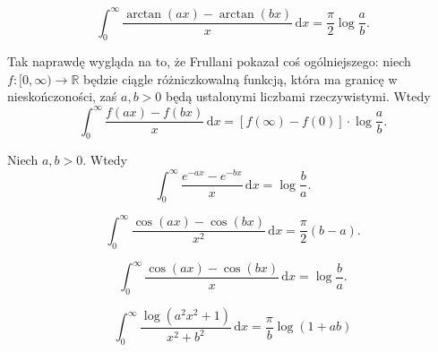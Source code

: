 \begin{problem}
    \begin{equation}
        \int_0^\infty \frac{\arctan (ax) - \arctan (bx)}{x} \,\mathrm{d}x = \frac \pi 2 \log \frac a b.
    \end{equation}
\end{problem}

Tak naprawdę wygląda na to, że Frullani pokazał coś ogólniejszego: niech $f \colon [0, \infty) \to \mathbb R$ będzie ciągle różniczkowalną funkcją, która ma granicę w nieskończoności, zaś $a, b > 0$ będą ustalonymi liczbami rzeczywistymi.
%
Wtedy
\begin{equation}
    \int_0^\infty \frac{f(ax) - f(bx)}{x} \,\mathrm{d} x = [f(\infty) - f(0)] \cdot \log \frac a b.
\end{equation}

\begin{problem}
    Niech $a, b > 0$.
    Wtedy
    \begin{equation}
        \int_0^\infty \frac{e^{-ax} - e^{-bx}}{x} \,\mathrm{d}x = \log \frac b a.
    \end{equation}
\end{problem}

\begin{problem}
    \begin{equation}
        \int_0^\infty \frac{\cos (ax) - \cos (bx)}{x^2} \,\mathrm{d}x = \frac \pi 2 (b - a).
    \end{equation}
\end{problem}

\begin{problem}
    \begin{equation}
        \int_0^\infty \frac{\cos (ax) - \cos (bx)}{x} \,\mathrm{d}x = \log \frac b a.
    \end{equation}
\end{problem}

\begin{problem}
    \label{nahin_kriegsrecht}
    \begin{equation}
        \int_0^\infty \frac{\log (a^2 x^2 + 1)}{x^2 + b^2} \,\mathrm{d}x = \frac \pi b \log (1 + ab)
    \end{equation}
\end{problem}

